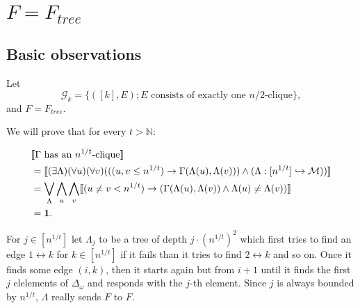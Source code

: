 \chapter{$F=F_{tree}$}

\section{Basic observations}

\begin{exam}
Let \[\mathcal{G}_k=\{([k],E);\text{$E$ consists of exactly one $n/2$-clique}\},\] and $F=F_{tree}$.

We will prove that for every $t>\mathbb{N}$: 

\begin{align}
&\llbracket\text{$\Gamma$ has an $n^{1/t}$-clique}\rrbracket\\
&=\llbracket(\exists \Lambda)(\forall u)(\forall v)(((u,v \leq n^{1/t})\to\Gamma(\Lambda(u),\Lambda(v)))\land(\Lambda:[n^{1/t}]\hookrightarrow\mathcal{M}))\rrbracket\\
&=\bigvee_\Lambda\bigwedge_u\bigwedge_v\llbracket(u\not=v < n^{1/t})\to(\Gamma(\Lambda(u),\Lambda(v))\land\Lambda(u)\not=\Lambda(v))\rrbracket\\
&=\textbf{1}.
\end{align}

For $j\in[n^{1/t}]$ let $\Lambda_j$ to be a tree of depth $j\cdot (n^{1/t})^2$ which first tries to find an edge $1\leftrightarrow k$ for $k\in[n^{1/t}]$ if it fails than it tries to find $2\leftrightarrow k$ and so on. Once it finds some edge $(i,k)$, then it starts again but from $i+1$ until it finds the first $j$ elelements of $\Delta_\omega$ and responds with the $j$-th element. Since $j$ is always bounded by $n^{1/t}$, $\Lambda$ really sends $F$ to $F$.

\end{exam}

